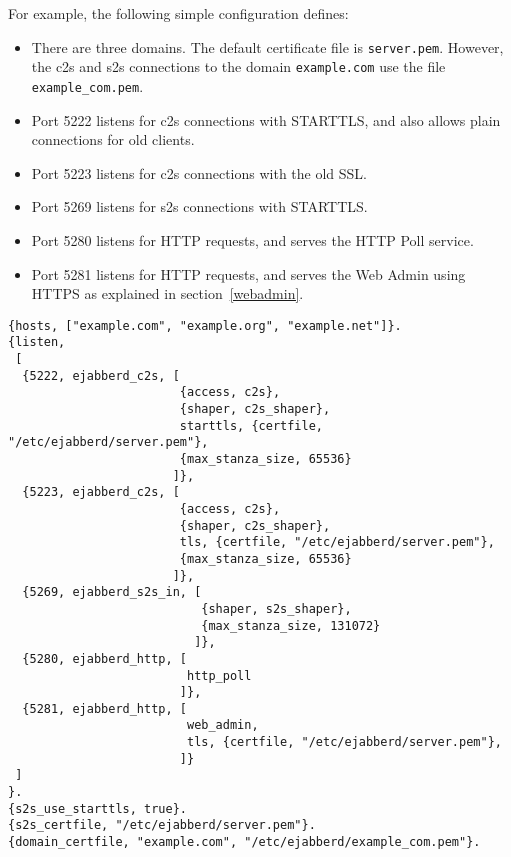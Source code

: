 \documentclass[a4paper,10pt]{book}
\newcommand{\term}[1]{\texttt{#1}}
\begin{document}
For example, the following simple configuration defines:
\begin{itemize}
\item There are three domains. The default certificate file is \term{server.pem}.
However, the c2s and s2s connections to the domain \term{example.com} use the file \term{example\_com.pem}.
\item Port 5222 listens for c2s connections with STARTTLS, 
  and also allows plain connections for old clients.
\item Port 5223 listens for c2s connections with the old SSL.
\item Port 5269 listens for s2s connections with STARTTLS.
\item Port 5280 listens for HTTP requests, and serves the HTTP Poll service.
\item Port 5281 listens for HTTP requests, and serves the Web Admin using HTTPS as explained in
  section~\ref{webadmin}.
\end{itemize}
\begin{verbatim}
{hosts, ["example.com", "example.org", "example.net"]}.
{listen,
 [
  {5222, ejabberd_c2s, [
                        {access, c2s}, 
                        {shaper, c2s_shaper},
                        starttls, {certfile, "/etc/ejabberd/server.pem"},
                        {max_stanza_size, 65536}
                       ]},
  {5223, ejabberd_c2s, [
                        {access, c2s},
                        {shaper, c2s_shaper},
                        tls, {certfile, "/etc/ejabberd/server.pem"},
                        {max_stanza_size, 65536}
                       ]},
  {5269, ejabberd_s2s_in, [
                           {shaper, s2s_shaper},
                           {max_stanza_size, 131072}
                          ]},
  {5280, ejabberd_http, [
                         http_poll
                        ]},
  {5281, ejabberd_http, [
                         web_admin,
                         tls, {certfile, "/etc/ejabberd/server.pem"},
                        ]}
 ]
}.
{s2s_use_starttls, true}.
{s2s_certfile, "/etc/ejabberd/server.pem"}.
{domain_certfile, "example.com", "/etc/ejabberd/example_com.pem"}.
\end{verbatim}
\end{document}
